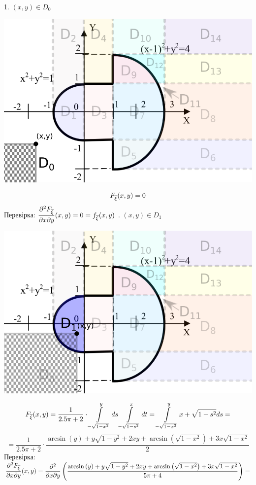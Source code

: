 \documentclass[14pt,a4paper]{scrartcl}
\theoremstyle{definition}
\theoremstyle{remark}
\theoremstyle{definition}
\theoremstyle{definition}
\begin{document}
1. $(x,y) \in D_0$
\begin{center} \includegraphics[scale=0.4]{assets/zone10.png} \end{center}
$$
F_{\overline{\xi}} (x,y) = 0
$$
Перевірка:
$\dfrac{\partial^2 F_{\overline{\xi}}}{\partial x \partial y}(x,y) = 0  = f_{\overline{\xi}} (x,y)$
. $(x,y) \in D_1$
\begin{center} \includegraphics[scale=0.4]{assets/zone21.png} \end{center}
$$
F_{\overline{\xi}} (x,y) =  \frac{1}{2.5\pi + 2} \cdot  \int\limits_{-\sqrt{1- x^2}}^{y}{ds  \int\limits_{-\sqrt{1-s^2}}^{x}{dt}} =   \int\limits_{-\sqrt{1- x^2}}^{y}{x+\sqrt{1-s^2}ds  } =
$$
$$
=\frac{1}{2.5\pi + 2} \cdot \dfrac{\arcsin\left(y\right)+y\sqrt{1-y^2}+2xy+\arcsin\left(\sqrt{1-x^2}\right)+3x\sqrt{1-x^2}}{2}
$$
Перевірка:\\
$\dfrac{\partial^2 F_{\overline{\xi}}}{\partial x \partial y}(x,y) = \dfrac{\partial^2}{\partial x \partial y} \left( \dfrac{\arcsin\left(y\right)+y\sqrt{1-y^2}+2xy+\arcsin\left(\sqrt{1-x^2}\right)+3x\sqrt{1-x^2}}{5\pi + 4}  \right) =$\\
\end{document}
